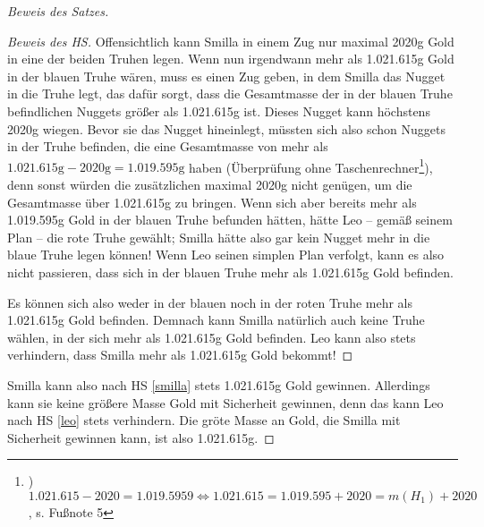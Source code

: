 \begin{proof}[Beweis des Satzes]
\begin{proof}[Beweis des HS]
        Offensichtlich kann Smilla in einem Zug nur maximal 2020g Gold  in eine der beiden Truhen legen. Wenn nun 
        irgendwann mehr als 1.021.615g Gold in der blauen Truhe wären, muss es einen Zug geben, in dem Smilla das 
        Nugget in die Truhe legt, das dafür sorgt, dass die Gesamtmasse der in der blauen Truhe befindlichen Nuggets 
        größer als 1.021.615g ist. Dieses Nugget kann höchstens 2020g wiegen. Bevor sie das Nugget hineinlegt, 
        müssten sich also schon Nuggets in der Truhe befinden, die eine Gesamtmasse von mehr als $1.021.615\text{g}-
        2020\text{g}=1.019.595\text{g}$ haben (Überprüfung ohne Taschenrechner\footnote{) $1.021.615-2020=
        1.019.5959 \Leftrightarrow 1.021.615=1.019.595+2020=m(H_1)+2020$, s. Fußnote 5}), 
        denn sonst würden die zusätzlichen maximal 2020g nicht genügen, um die Gesamtmasse über 1.021.615g zu 
        bringen. Wenn sich aber bereits mehr als 1.019.595g Gold in der blauen Truhe befunden hätten, hätte Leo -- 
        gemäß seinem Plan -- die rote Truhe gewählt; Smilla hätte also gar kein Nugget mehr in die blaue Truhe 
        legen können! Wenn Leo seinen simplen Plan verfolgt, kann es also nicht passieren, dass sich in der blauen 
        Truhe mehr als 1.021.615g Gold befinden. 

        Es können sich also weder in der blauen noch in der roten Truhe mehr als 1.021.615g Gold befinden. Demnach 
        kann Smilla natürlich auch keine Truhe wählen, in der sich mehr als 1.021.615g Gold befinden. Leo kann also 
        stets verhindern, dass Smilla mehr als 1.021.615g Gold bekommt!
    \end{proof}
    \renewcommand{\qedsymbol}{$\blacksquare$}
    Smilla kann also nach HS \ref{smilla} stets 1.021.615g Gold gewinnen. Allerdings kann sie keine größere Masse 
    Gold mit Sicherheit gewinnen, denn das kann Leo nach HS \ref{leo} stets verhindern. Die gröte Masse an Gold, 
    die Smilla mit Sicherheit gewinnen kann, ist also 1.021.615g.
\end{proof}